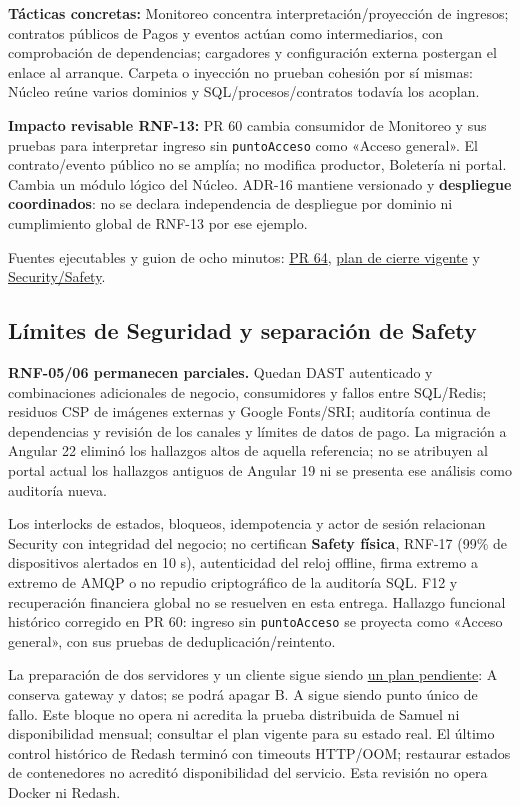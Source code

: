 \textbf{Tácticas concretas:} Monitoreo concentra interpretación/proyección de
ingresos; contratos públicos de Pagos y eventos actúan como intermediarios, con
comprobación de dependencias; cargadores y configuración externa postergan el
enlace al arranque. Carpeta o inyección no prueban cohesión por sí mismas:
Núcleo reúne varios dominios y SQL/procesos/contratos todavía los acoplan.

\textbf{Impacto revisable RNF-13:} PR 60 cambia consumidor de Monitoreo y sus
pruebas para interpretar ingreso sin \texttt{puntoAcceso} como «Acceso general».
El contrato/evento público no se amplía; no modifica productor, Boletería ni
portal. Cambia un módulo lógico del Núcleo. ADR-16 mantiene versionado y
\textbf{despliegue coordinados}: no se declara independencia de despliegue por
dominio ni cumplimiento global de RNF-13 por ese ejemplo.

Fuentes ejecutables y guion de ocho minutos:
\href{https://github.com/Emperador24/HEXACORE/pull/64}{PR 64},
\href{https://github.com/Emperador24/HEXACORE/blob/main/Documentation/Work/PLAN-CIERRE-SEBASTIAN.md}{plan de cierre vigente} y
\href{https://github.com/Emperador24/HEXACORE/blob/main/App/infra/informe-atributos/seguridad/SECURITY-SAFETY.md}{Security/Safety}.

\subsection{Límites de Seguridad y separación de Safety}
\textbf{RNF-05/06 permanecen parciales.} Quedan DAST autenticado y combinaciones
adicionales de negocio, consumidores y fallos entre SQL/Redis; residuos CSP de
imágenes externas y Google Fonts/SRI; auditoría continua de dependencias y revisión de los
canales y límites de datos de pago. La migración a Angular 22 eliminó los
hallazgos altos de aquella referencia; no se atribuyen al portal actual los
hallazgos antiguos de Angular 19 ni se presenta ese análisis como auditoría nueva.

Los interlocks de estados, bloqueos, idempotencia y actor de sesión relacionan
Security con integridad del negocio; no certifican \textbf{Safety física},
RNF-17 (99\% de dispositivos alertados en 10 s), autenticidad del reloj offline,
firma extremo a extremo de AMQP o no repudio criptográfico de la auditoría SQL.
F12 y recuperación financiera global no se resuelven en esta entrega.
Hallazgo funcional histórico corregido en PR 60: ingreso sin \texttt{puntoAcceso}
se proyecta como «Acceso general», con sus pruebas de deduplicación/reintento.

La preparación de dos servidores y un cliente sigue siendo
\href{https://github.com/Emperador24/HEXACORE/blob/main/Documentation/Work/PLAN-DEMO-ZEROTIER.md}{un plan pendiente}:
A conserva gateway y datos; se podrá apagar B. A sigue siendo punto único de
fallo. Este bloque no opera ni acredita la prueba distribuida de Samuel ni disponibilidad
mensual; consultar el plan vigente para su estado real. El último control histórico de Redash terminó con
timeouts HTTP/OOM; restaurar estados de contenedores no acreditó disponibilidad
del servicio. Esta revisión no opera Docker ni Redash.
